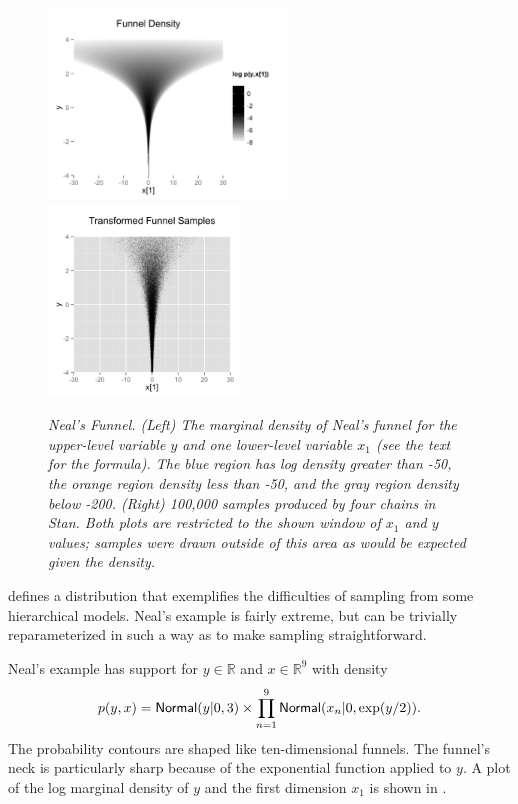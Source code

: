 \begin{figure}
\vspace*{-6pt}
\begin{center}
\includegraphics[height=2in]{R/funnel.png}
\includegraphics[height=2in]{R/funnel-fit.png}
\end{center}
\vspace*{-18pt}
\caption{\it Neal's Funnel.  (Left) The marginal density of Neal's funnel for the upper-level
  variable $y$ and one lower-level variable $x_1$ (see the text for
  the formula).  The blue region has log density greater
    than -50, the orange region density less than -50, and the gray
    region density below -200.  (Right) 100,000 samples produced by
    four chains in Stan.  Both plots are restricted to
    the shown window of $x_1$ and $y$ values; samples were drawn
    outside of this area as would be expected given the density.}\label{funnel.figure}
\end{figure}

\citep{Neal:2003} defines a distribution that exemplifies the
difficulties of sampling from some hierarchical models.  Neal's
example is fairly extreme, but can be trivially reparameterized in
such a way as to make sampling straightforward.

Neal's example has support for $y \in
\mathbb{R}$ and  $x \in \mathbb{R}^9$ with density
%
\[
p(y,x) = \mbox{\sf Normal}(y|0,3) \times \prod_{n=1}^9
\mbox{\sf Normal}(x_n|0,\exp(y/2)).
\]
%
The probability contours are shaped like ten-dimensional funnels.  The
funnel's neck is particularly sharp because of the exponential
function applied to $y$.  A plot of the log marginal density of $y$
and the first dimension $x_1$ is shown in .

